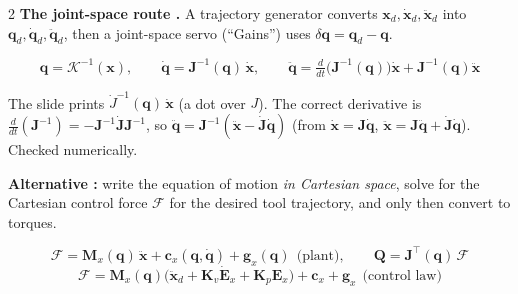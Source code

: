 \begin{multicols}{2}
\textbf{The joint-space route .} A trajectory generator converts $\mathbf x_d,\dot{\mathbf x}_d,\ddot{\mathbf x}_d$ into $\mathbf q_d,\dot{\mathbf q}_d,\ddot{\mathbf q}_d$, then a joint-space servo (``Gains'') uses $\delta\mathbf q=\mathbf q_d-\mathbf q$.
\begin{wnfig}\end{wnfig}
\begin{fbx}
\[\mathbf q=\mathcal K^{-1}(\mathbf x),\qquad \dot{\mathbf q}=\mathbf J^{-1}(\mathbf q)\,\dot{\mathbf x},\qquad \ddot{\mathbf q}=\tfrac{d}{dt}\big(\mathbf J^{-1}(\mathbf q)\big)\dot{\mathbf x}+\mathbf J^{-1}(\mathbf q)\ddot{\mathbf x}\]
\end{fbx}
\begin{slideerr}[p.\,31]
The slide prints $\dot J^{-1}(\mathbf q)\,\dot{\mathbf x}$ (a dot over $J$). The correct derivative is $\tfrac d{dt}(\mathbf J^{-1})=-\mathbf J^{-1}\dot{\mathbf J}\mathbf J^{-1}$, so $\ddot{\mathbf q}=\mathbf J^{-1}(\ddot{\mathbf x}-\dot{\mathbf J}\dot{\mathbf q})$ (from $\dot{\mathbf x}=\mathbf J\dot{\mathbf q}$, $\ddot{\mathbf x}=\mathbf J\ddot{\mathbf q}+\dot{\mathbf J}\dot{\mathbf q}$). Checked numerically. \chk
\end{slideerr}
\textbf{Alternative :} write the equation of motion \emph{in Cartesian space}, solve for the Cartesian control force $\mathcal F$ for the desired tool trajectory, and only then convert to torques.
\begin{fbx}\label{w9:cart}
\[\mathcal F=\mathbf M_x(\mathbf q)\,\ddot{\mathbf x}+\mathbf c_x(\mathbf q,\dot{\mathbf q})+\mathbf g_x(\mathbf q)\ \ \text{(plant)},\qquad \mathbf Q=\mathbf J^\top(\mathbf q)\,\mathcal F\]
\[\mathcal F=\mathbf M_x(\mathbf q)\big(\ddot{\mathbf x}_d+\mathbf K_v\dot{\mathbf E}_x+\mathbf K_p\mathbf E_x\big)+\mathbf c_x+\mathbf g_x\ \ \text{(control law)}\]

\end{fbx}
\end{multicols}
